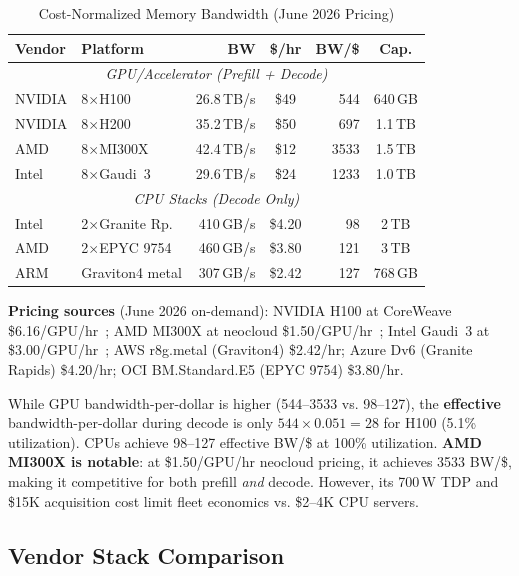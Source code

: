 \documentclass[conference,10pt]{IEEEtran}
\begin{document}
\begin{table}[!htbp]
\caption{Cost-Normalized Memory Bandwidth (June 2026 Pricing)}
\label{tab:costbw}
\centering\scriptsize
\begin{tabular}{@{}llrcrc@{}}
\toprule
\textbf{Vendor} & \textbf{Platform} & \textbf{BW} & \textbf{\$/hr} & \textbf{BW/\$} & \textbf{Cap.} \\
\midrule
\multicolumn{6}{c}{\textit{GPU/Accelerator (Prefill + Decode)}} \\
\midrule
NVIDIA & 8$\times$H100 & 26.8\,TB/s & \$49 & 544 & 640\,GB \\
NVIDIA & 8$\times$H200 & 35.2\,TB/s & \$50 & 697 & 1.1\,TB \\
AMD & 8$\times$MI300X & 42.4\,TB/s & \$12 & 3533 & 1.5\,TB \\
Intel & 8$\times$Gaudi~3 & 29.6\,TB/s & \$24 & 1233 & 1.0\,TB \\
\midrule
\multicolumn{6}{c}{\textit{CPU Stacks (Decode Only)}} \\
\midrule
Intel & 2$\times$Granite Rp. & 410\,GB/s & \$4.20 & 98 & 2\,TB \\
AMD & 2$\times$EPYC 9754 & 460\,GB/s & \$3.80 & 121 & 3\,TB \\
ARM & Graviton4 metal & 307\,GB/s & \$2.42 & 127 & 768\,GB \\
\bottomrule
\end{tabular}
\end{table}

\textbf{Pricing sources} (June 2026 on-demand): NVIDIA H100 at CoreWeave \$6.16/GPU/hr~\cite{nvidia2024b200}; AMD MI300X at neocloud \$1.50/GPU/hr~\cite{amd2024mi300x}; Intel Gaudi~3 at \$3.00/GPU/hr~\cite{intel2024gaudi3}; AWS r8g.metal (Graviton4) \$2.42/hr; Azure Dv6 (Granite Rapids) \$4.20/hr; OCI BM.Standard.E5 (EPYC 9754) \$3.80/hr.

While GPU bandwidth-per-dollar is higher (544--3533 vs. 98--127), the \textbf{effective} bandwidth-per-dollar during decode is only $544 \times 0.051 = 28$ for H100 (5.1\% utilization). CPUs achieve 98--127 effective BW/\$ at 100\% utilization. \textbf{AMD MI300X is notable}: at \$1.50/GPU/hr neocloud pricing, it achieves 3533 BW/\$, making it competitive for both prefill \emph{and} decode. However, its 700\,W TDP and \$15K acquisition cost limit fleet economics vs. \$2--4K CPU servers.

\subsection{Vendor Stack Comparison}
\end{document}
